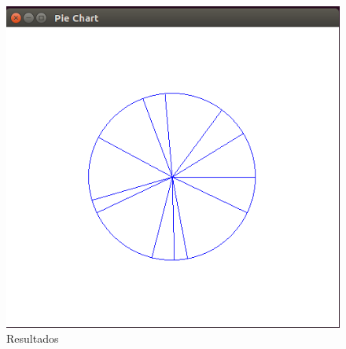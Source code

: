 \documentclass[a4paper,12pt]{article}
\begin{document}
\begin{enumerate}
\begin{figure}[H]
 \centering
 \includegraphics[scale = 0.5]{5.png}
 \caption{Resultados}
\end{figure}




 
\end{enumerate}
\end{document}
